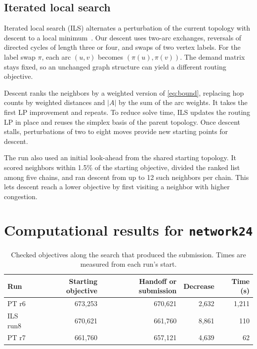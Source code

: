 \documentclass[a4paper]{article}
\begin{document}
\subsection{Iterated local search}

Iterated local search (ILS) alternates a perturbation of the current topology with descent to a local minimum~\cite{lourenco}.
Our descent uses two-arc exchanges, reversals of directed cycles of length three or four, and swaps of two vertex labels.
For the label swap \(\pi\), each arc \((u,v)\) becomes \((\pi(u),\pi(v))\). The demand matrix stays fixed, so an unchanged
graph structure can yield a different routing objective.

Descent ranks the neighbors by a weighted version of \eqref{eq:bound}, replacing hop counts by weighted distances and
\(\lvert A\rvert\) by the sum of the arc weights. It takes the first LP improvement and repeats.
To reduce solve time, ILS updates the routing LP in place and reuses the simplex basis of the parent topology.
Once descent stalls, perturbations of two to eight moves provide new starting points for descent.

The run also used an initial look-ahead from the shared starting topology. It scored neighbors within 1.5\% of the
starting objective, divided the ranked list among five chains, and ran descent from up to 12 such neighbors per chain.
This lets descent reach a lower objective by first visiting a neighbor with higher congestion.

\section{Computational results for \texttt{network24}}

\begin{table}[htbp]
\centering
\caption{Checked objectives along the search that produced the submission. Times are measured from each run's start.}
\label{tab:runs}
\begin{tabular}{@{}lrrrr@{}}
\toprule
Run & Starting objective & Handoff or submission & Decrease & Time (s)\\
\midrule
PT r6    & 673,253 & 670,621 & 2,632 & 1,211\\
ILS run8 & 670,621 & 661,760 & 8,861 &   110\\
PT r7    & 661,760 & 657,121 & 4,639 &    62\\
\bottomrule
\end{tabular}
\end{table}
\end{document}
